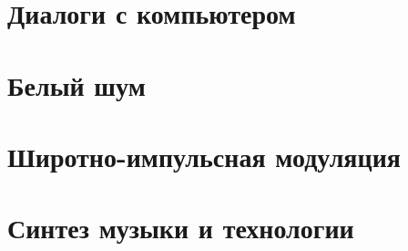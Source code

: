 \documentclass[a4paper,twoside]{book}
\begin{document}






\chapter{Диалоги с компьютером}
\label{chapter:dialogues-with-computer}







\newpage








\chapter{Белый шум}








\chapter{Широтно-импульсная модуляция}
\label{chapter:pwm}






\chapter{Синтез музыки и технологии}
\label{chapter:sound}
\end{document}
